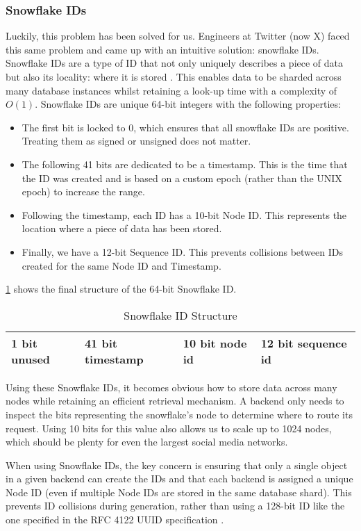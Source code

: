 \subsubsection{Snowflake IDs} 
Luckily, this problem has been solved for us. Engineers at Twitter (now X) faced this same problem and came up with an intuitive solution: snowflake IDs. Snowflake IDs are a type of ID that not only uniquely describes a piece of data but also its locality: where it is stored \citep{2010snowflake}. This enables data to be sharded across many database instances whilst retaining a look-up time with a complexity of $O(1)$.
Snowflake IDs are unique 64-bit integers with the following properties:
\begin{itemize}
    \item The first bit is locked to 0, which ensures that all snowflake IDs are positive. Treating them as signed or unsigned does not matter.
    \item The following 41 bits are dedicated to be a timestamp. This is the time that the ID was created and is based on a custom epoch (rather than the UNIX epoch) to increase the range.
    \item Following the timestamp, each ID has a 10-bit Node ID. This represents the location where a piece of data has been stored.
    \item Finally, we have a 12-bit Sequence ID. This prevents collisions between IDs created for the same Node ID and Timestamp.
\end{itemize}
\ref{tab:snowflake} shows the final structure of the 64-bit Snowflake ID.

\begin{table}[htbp]
\centering
\begin{tabular}{|l|l|l|l|}
\hline
1 bit unused & 41 bit timestamp & 10 bit node id & 12 bit sequence id \\ \hline
\end{tabular}
\caption{Snowflake ID Structure}
\label{tab:snowflake}
\end{table}

Using these Snowflake IDs, it becomes obvious how to store data across many nodes while retaining an efficient retrieval mechanism. A backend only needs to inspect the bits representing the snowflake's node to determine where to route its request. Using 10 bits for this value also allows us to scale up to 1024 nodes, which should be plenty for even the largest social media networks.

When using Snowflake IDs, the key concern is ensuring that only a single object in a given backend can create the IDs and that each backend is assigned a unique Node ID (even if multiple Node IDs are stored in the same database shard). 
This prevents ID collisions during generation, rather than using a 128-bit ID like the one specified in the RFC 4122 UUID specification \citep{rfc4122}.

